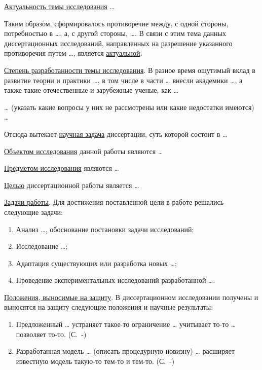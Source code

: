 
%
%
%
%

\underline{Актуальность темы исследования} \dots{}

Таким образом, сформировалось противоречие между, с одной стороны,
потребностью в \dots{}, а, с другой стороны, \dots{}. В связи с этим
тема данных диссертационных исследований, направленных на разрешение
указанного противоречия путем \dots{}, является
\underline{актуальной}.

\underline{Степень разработанности темы исследования}. В разное время
ощутимый вклад в развитие теории и практики \dots{}, в том числе в
части \dots{} внесли академики \dots{}, а также такие отечественные и
зарубежные ученые, как \dots{}

\dots{} (указать какие вопросы у них не рассмотрены или какие
недостатки имеются) \dots{}

Отсюда вытекает \underline{научная задача} диссертации, суть которой
состоит в \dots{}

\underline{Объектом исследования} данной работы являются \dots{}

\underline{Предметом исследования} являются \dots{}

\underline{Целью} диссертационной работы является \dots{}

\underline{Задачи работы}. Для достижения поставленной цели в работе
решались следующие задачи:
\begin{enumerate}
\item Анализ \dots{}, обоснование постановки задачи исследований;
\item Исследование \dots{};
\item Адаптация существующих или разработка новых \dots{};
\item Проведение экспериментальных исследований разработанной \dots{}.
\end{enumerate}

\underline{Положения, выносимые на защиту}. В диссертационном
исследовании получены и выносятся на защиту следующие положения и
научные результаты:
\begin{enumerate}
\item Предложенный \dots{} устраняет такое-то ограничение \dots{}
  учитывает то-то \dots{} позволяет
  то-то. (С.~\pageref{sect1_1}-\pageref{sect1_1-eof})
\item Разработанная модель \dots{} (описать процедурную новизну)
  \dots{} расширяет известную модель такую-то тем-то и
  тем-то. (С.~\pageref{sect2_1}-\pageref{sect2_1-eof})
\end{enumerate}

